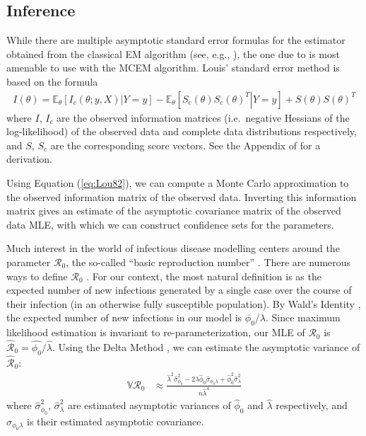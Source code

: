 \documentclass[11pt, oneside]{article}   	%
\newcommand{\bV}{\mathbb{V}}
\newcommand{\bE}{\mathbb{E}}
\begin{document}
\subsection{Inference}
\label{sec:inference}

While there are multiple asymptotic standard error formulas for the estimator obtained from the classical EM algorithm (see, e.g., \citealp{McL08}), the one due to \citet{Lou82} is most amenable to use with the MCEM algorithm. Louis' standard error method is based on the formula
%
\begin{align}
	I(\theta) = \bE_{\theta} \left[ \left. I_c(\theta; y, X) \right| Y=y \right] - \bE_{\theta} \left[ \left. S_c(\theta) S_c(\theta)^T \right| Y=y \right] + S(\theta) S(\theta)^T \label{eq:Lou82}
\end{align}
%
where $I$, $I_c$ are the observed information matrices (i.e.\ negative Hessians of the log-likelihood) of the observed data and complete data distributions respectively, and $S$, $S_c$ are the corresponding score vectors. See the Appendix of \citet{Lou82} for a derivation.

Using Equation (\ref{eq:Lou82}), we can compute a Monte Carlo approximation to the observed information matrix of the observed data. Inverting this information matrix gives an estimate of the asymptotic covariance matrix of the observed data MLE, with which we can construct confidence sets for the parameters.

Much interest in the world of infectious disease modelling centers around the parameter $\mathscr{R}_0$, the so-called ``basic reproduction number'' \citep{Whi20}. There are numerous ways to define $\mathscr{R}_0$ \citep[see, e.g., Chapter 5 of][]{Mar15}. For our context, the most natural definition is as the expected number of new infections generated by a single case over the course of their infection (in an otherwise fully susceptible population). By Wald's Identity \citep[see, e.g., Theorem 5.5 of][]{Kle14}, the expected number of new infections in our model is $\phi_0 / \lambda$. Since maximum likelihood estimation is invariant to re-parameterization, our MLE of $\mathscr{R}_0$ is $\hat{\mathscr{R}}_0 = \hat{\phi_0}/\hat{\lambda}$. Using the Delta Method \citep[see, e.g., Chapter 3 of][]{van98}, we can estimate the asymptotic variance of $\hat{\mathscr{R}}_0$:
%
\begin{align}
	\bV \hat{\mathscr{R}}_0 & \approx \frac{\hat{\lambda}^2 \hat{\sigma}_{\phi_0}^2 - 2 \hat{\lambda} \hat{\phi}_0 \hat{\sigma}_{\phi_0 \lambda} + \hat{\phi}_0^2 \hat{\sigma}_\lambda^2}{n \hat{\lambda}^4} \label{eq:R0_SE}
\end{align}
%
where $\hat{\sigma}_{\phi_0}^2$, $\hat{\sigma}_\lambda^2$ are estimated asymptotic variances of $\hat{\phi}_0$ and $\hat{\lambda}$ respectively, and $\hat{\sigma}_{\phi_0 \lambda}$ is their estimated asymptotic covariance.
\end{document}
